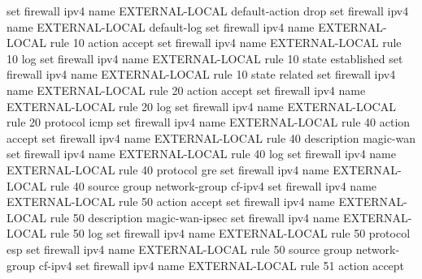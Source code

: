 \documentclass[
]{article}
\newenvironment{Shaded}{\begin{snugshade}}{\end{snugshade}}
\newcommand{\BuiltInTok}[1]{#1}
\newcommand{\NormalTok}[1]{#1}
\newcommand{\StringTok}[1]{\textcolor[rgb]{0.31,0.60,0.02}{#1}}
\begin{document}
\begin{Shaded}
\begin{Highlighting}[numbers=left,,]
\BuiltInTok{set}\NormalTok{ firewall ipv4 name EXTERNAL{-}LOCAL default{-}action }\StringTok{\textquotesingle{}drop\textquotesingle{}}
\BuiltInTok{set}\NormalTok{ firewall ipv4 name EXTERNAL{-}LOCAL default{-}log}
\BuiltInTok{set}\NormalTok{ firewall ipv4 name EXTERNAL{-}LOCAL rule 10 action }\StringTok{\textquotesingle{}accept\textquotesingle{}}
\BuiltInTok{set}\NormalTok{ firewall ipv4 name EXTERNAL{-}LOCAL rule 10 log}
\BuiltInTok{set}\NormalTok{ firewall ipv4 name EXTERNAL{-}LOCAL rule 10 state }\StringTok{\textquotesingle{}established\textquotesingle{}}
\BuiltInTok{set}\NormalTok{ firewall ipv4 name EXTERNAL{-}LOCAL rule 10 state }\StringTok{\textquotesingle{}related\textquotesingle{}}
\BuiltInTok{set}\NormalTok{ firewall ipv4 name EXTERNAL{-}LOCAL rule 20 action }\StringTok{\textquotesingle{}accept\textquotesingle{}}
\BuiltInTok{set}\NormalTok{ firewall ipv4 name EXTERNAL{-}LOCAL rule 20 log}
\BuiltInTok{set}\NormalTok{ firewall ipv4 name EXTERNAL{-}LOCAL rule 20 protocol }\StringTok{\textquotesingle{}icmp\textquotesingle{}}
\BuiltInTok{set}\NormalTok{ firewall ipv4 name EXTERNAL{-}LOCAL rule 40 action }\StringTok{\textquotesingle{}accept\textquotesingle{}}
\BuiltInTok{set}\NormalTok{ firewall ipv4 name EXTERNAL{-}LOCAL rule 40 description }\StringTok{\textquotesingle{}magic{-}wan\textquotesingle{}}
\BuiltInTok{set}\NormalTok{ firewall ipv4 name EXTERNAL{-}LOCAL rule 40 log}
\BuiltInTok{set}\NormalTok{ firewall ipv4 name EXTERNAL{-}LOCAL rule 40 protocol }\StringTok{\textquotesingle{}gre\textquotesingle{}}
\BuiltInTok{set}\NormalTok{ firewall ipv4 name EXTERNAL{-}LOCAL rule 40 source group network{-}group }\StringTok{\textquotesingle{}cf{-}ipv4\textquotesingle{}}
\BuiltInTok{set}\NormalTok{ firewall ipv4 name EXTERNAL{-}LOCAL rule 50 action }\StringTok{\textquotesingle{}accept\textquotesingle{}}
\BuiltInTok{set}\NormalTok{ firewall ipv4 name EXTERNAL{-}LOCAL rule 50 description }\StringTok{\textquotesingle{}magic{-}wan{-}ipsec\textquotesingle{}}
\BuiltInTok{set}\NormalTok{ firewall ipv4 name EXTERNAL{-}LOCAL rule 50 log}
\BuiltInTok{set}\NormalTok{ firewall ipv4 name EXTERNAL{-}LOCAL rule 50 protocol }\StringTok{\textquotesingle{}esp\textquotesingle{}}
\BuiltInTok{set}\NormalTok{ firewall ipv4 name EXTERNAL{-}LOCAL rule 50 source group network{-}group }\StringTok{\textquotesingle{}cf{-}ipv4\textquotesingle{}}
\BuiltInTok{set}\NormalTok{ firewall ipv4 name EXTERNAL{-}LOCAL rule 51 action }\StringTok{\textquotesingle{}accept\textquotesingle{}}

\end{Highlighting}
\end{Shaded}
\end{document}
